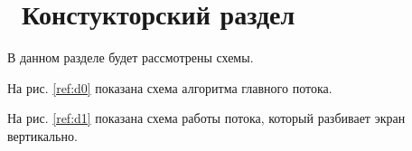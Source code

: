 \chapter{ Констукторский раздел}
\label{cha:design}

В данном разделе будет рассмотрены схемы.

На рис. \ref{ref:d0} показана схема алгоритма главного потока.

\begin{figure}[ht!]
\end{figure}

На рис. \ref{ref:d1} показана схема работы потока, который разбивает
экран вертикально. 

